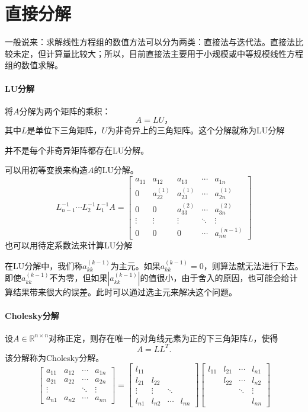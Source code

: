 \documentclass[UTF8]{article}
\begin{document}
\section{直接分解}
\begin{flushleft}
一般说来：求解线性方程组的数值方法可以分为两类：直接法与迭代法。直接法比较未定，但计算量比较大；所以，目前直接法主要用于小规模或中等规模线性方程组的数值求解。
\paragraph{LU分解}
将$A$分解为两个矩阵的乘积：
$$A=LU，$$
其中$L$是单位下三角矩阵，$U$为非奇异上的三角矩阵。这个分解就称为\textcolor[rgb]{0.00,0.07,1.00}{LU分解}

\textcolor[rgb]{0.50,0.50,0.50}{
并不是每个非奇异矩阵都存在LU分解。}

可以用初等变换来构造$A$的LU分解。
$$
L_{n-1}^{-1}\cdots L_{2}^{-1}L_{1}^{-1}A=
\begin{bmatrix}
a_{11} & a_{12} & a_{13} & \cdots & a_{1n} \\
0 & a_{22}^{(1)} & a_{23}^{(1)} & \cdots & a_{2n}^{(1)} \\
0 & 0 & a_{33}^{(2)} & \cdots & a_{3n}^{(2)} \\
\vdots & \vdots & \vdots & \ddots & \vdots \\
0 & 0 & 0 & \cdots & a_{nn}^{(n-1)}
\end{bmatrix}
$$
\bigskip
也可以用待定系数法来计算LU分解

在LU分解中，我们称$a_{kk}^{(k-1)}$为主元。如果$a_{kk}^{(k-1)}=0$，则算法就无法进行下去。即使$a_{kk}^{(k-1)}$不为零，但如果$|a_{kk}^{(k-1)}|$的值很小，由于舍入的原因，也可能会给计算结果带来很大的误差。此时可以通过\textcolor[rgb]{0.00,0.07,1.00}{选主元}来解决这个问题。

\paragraph{Cholesky分解}
设$A\in\mathbb{R}^{n \times n}$对称正定，则存在唯一的对角线元素为正的下三角矩阵$L$，使得
$$A=LL^T.$$
该分解称为Cholesky分解。
$$
\begin{bmatrix}
a_{11} & a_{12} & \cdots & a_{1n} \\
a_{21} & a_{22} & \cdots & a_{2n} \\
\vdots &        & \ddots & \vdots \\
a_{n1} & a_{n2} & \cdots & a_{nn}
\end{bmatrix}
=
\begin{bmatrix}
l_{11} & & &  \\
l_{21} & l_{22} & & \\
\vdots & \vdots & \ddots & \\
l_{n1} & l_{n2} & \cdots & l_{nn}
\end{bmatrix}
\begin{bmatrix}
l_{11} & l_{21} & \cdots & l_{n1} \\
 & l_{22} & \cdots & l_{n2} \\
 &  & \ddots & \vdots \\
 &  &  & l_{nn}
\end{bmatrix}
$$


\end{flushleft}
\end{document}
